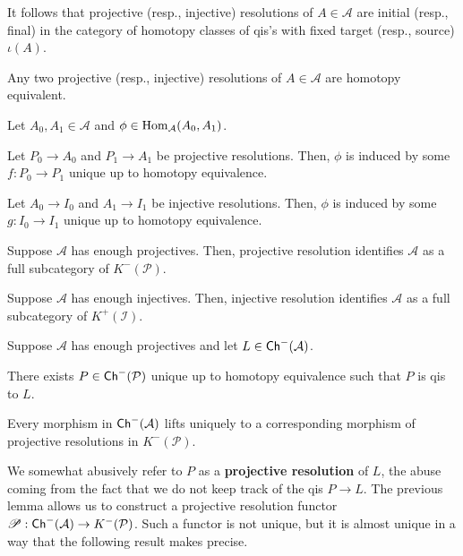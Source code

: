 \documentclass[11pt]{article}
\renewcommand{\A}{\mathcal{A}}
\newcommand{\I}{\mathcal{I}}
\renewcommand{\P}{\mathcal{P}}
\begin{document}
It follows that projective (resp., injective) resolutions of $A\in\A$ are initial (resp., final) in the category of homotopy classes of qis's with fixed target (resp., source) $\iota(A)$.

\begin{corollary}
Any two projective (resp., injective) resolutions of $A\in\A$ are homotopy equivalent.
\end{corollary}

\begin{lemma}[A, Prop 6.5]
Let $A_0,A_1\in\A$ and $\phi\in\Hom_{\A}(A_0,A_1)$.
\begin{enum}{\alph}
\item Let $P_0\to A_0$ and $P_1\to A_1$ be projective resolutions. Then, $\phi$ is induced by some $f: P_0\to P_1$ unique up to homotopy equivalence.

\item Let $A_0\to I_0$ and $A_1\to I_1$ be injective resolutions. Then, $\phi$ is induced by some $g: I_0\to I_1$ unique up to homotopy equivalence.
\end{enum}
\end{lemma}

\begin{corollary}
\hfill
\begin{enum}{\alph}
\item Suppose $\A$ has enough projectives. Then, projective resolution identifies $\A$ as a full subcategory of $K^-(\P)$.

\item Suppose $\A$ has enough injectives. Then, injective resolution identifies $\A$ as a full subcategory of $K^+(\I)$.
\end{enum}
\end{corollary}

\begin{theorem}[A, Thm 6.6]
Suppose $\A$ has enough projectives and let $L\in\Ch^-(\A)$. 
\begin{enum}{\alph}
\item There exists $P\in\Ch^-(\P)$ unique up to homotopy equivalence such that $P$ is qis to $L$.

\item Every morphism in $\Ch^-(\A)$ lifts uniquely to a corresponding morphism of projective resolutions in $K^-(\P)$.
\end{enum}
\end{theorem}

We somewhat abusively refer to $P$ as a \textbf{projective resolution} of $L$, the abuse coming from the fact that we do not keep track of the qis $P\to L$. The previous lemma allows us to construct a projective resolution functor $\ms{P}: \Ch^-(\A)\to K^-(\P)$. Such a functor is not unique, but it is almost unique in a way that the following result makes precise.
\end{document}
